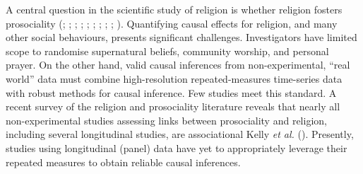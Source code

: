 \documentclass[
  single column]{article}
\begin{document}
A central question in the scientific study of religion is whether
religion fosters prosociality (; ;
;
;
;
; ; ;
;
).
Quantifying causal effects for religion, and many other social
behaviours, presents significant challenges. Investigators have limited
scope to randomise supernatural beliefs, community worship, and personal
prayer. On the other hand, valid causal inferences from
non-experimental, ``real world'' data must combine high-resolution
repeated-measures time-series data with robust methods for causal
inference. Few studies meet this standard. A recent survey of the
religion and prosociality literature reveals that nearly all
non-experimental studies assessing links between prosociality and
religion, including several longitudinal studies, are associational
Kelly \emph{et al.} ().
Presently, studies using longitudinal (panel) data have yet to
appropriately leverage their repeated measures to obtain reliable causal
inferences.
\end{document}
